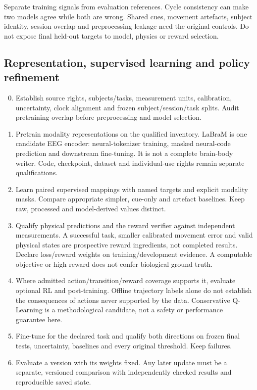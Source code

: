 Separate training signals from evaluation references. Cycle consistency can make two models agree while both are wrong. Shared cues, movement artefacts, subject identity, session overlap and preprocessing leakage need the original controls. Do not expose final held-out targets to model, physics or reward selection.

\subsection{Representation, supervised learning and policy refinement}
\begin{enumerate}
\setcounter{enumi}{-1}
\item Establish source rights, subjects/tasks, measurement units, calibration,    uncertainty, clock alignment and frozen subject/session/task splits. Audit    pretraining overlap before preprocessing and model selection.
\item Pretrain modality representations on the qualified inventory. LaBraM is one    candidate EEG encoder: neural-tokenizer training, masked neural-code prediction    and downstream fine-tuning. It is not a complete brain-body writer. Code,    checkpoint, dataset and individual-use rights remain separate qualifications.
\item Learn paired supervised mappings with named targets and explicit modality    masks. Compare appropriate simpler, cue-only and artefact baselines. Keep raw,    processed and model-derived values distinct.
\item Qualify physical predictions and the reward verifier against independent    measurements. A successful task, smaller calibrated movement error and valid    physical states are prospective reward ingredients, not completed results.    Declare loss/reward weights on training/development evidence. A computable    objective or high reward does not confer biological ground truth.
\item Where admitted action/transition/reward coverage supports it, evaluate optional    RL and post-training. Offline trajectory labels alone do not establish the    consequences of actions never supported by the data. Conservative Q-Learning    is a methodological candidate, not a safety or performance guarantee here.
\item Fine-tune for the declared task and qualify both directions on frozen final    tests, uncertainty, baselines and every original threshold. Keep failures.
\item Evaluate a version with its weights fixed. Any later update must be a separate, versioned comparison with independently checked results and reproducible saved state.
\end{enumerate}

